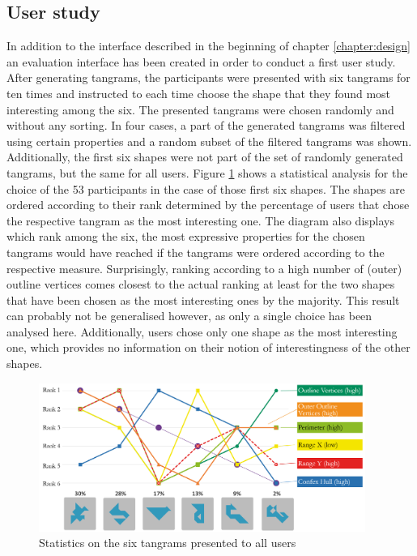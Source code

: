 \subsection{User study}

In addition to the interface described in the beginning of chapter \ref{chapter:design} an evaluation interface has been created in order to conduct a first user study. After generating tangrams, the participants were presented with six tangrams for ten times and instructed to each time choose the shape that they found most interesting among the six. The presented tangrams were chosen randomly and without any sorting. In four cases, a part of the generated tangrams was filtered using certain properties and a random subset of the filtered tangrams was shown. Additionally, the first six shapes were not part of the set of randomly generated tangrams, but the same for all users. Figure \ref{result} shows a statistical analysis for the choice of the 53 participants in the case of those first six shapes. The shapes are ordered according to their rank determined by the percentage of users that chose the respective tangram as the most interesting one. The diagram also displays which rank among the six, the most expressive properties for the chosen tangrams would have reached if the tangrams were ordered according to the respective measure. Surprisingly, ranking according to a high number of (outer) outline vertices comes closest to the actual ranking at least for the two shapes that have been chosen as the most interesting ones by the majority. This result can probably not be generalised however, as only a single choice has been analysed here. Additionally, users chose only one shape as the most interesting one, which provides no information on their notion of interestingness of the other shapes.

\begin{figure}
\centering
    \includegraphics[width=0.95\textwidth]{figures/diagram.png}
  \caption{Statistics on the six tangrams presented to all users}  
  \label{result}
\end{figure}